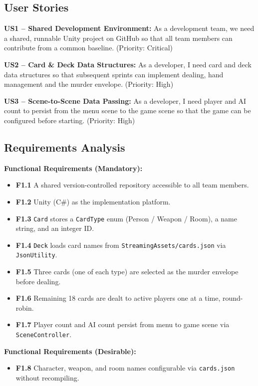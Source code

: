 \subsection*{User Stories}

\textbf{US1 -- Shared Development Environment:} As a development team, we need a shared, runnable Unity project on GitHub so that all team members can contribute from a common baseline. (Priority: Critical)

\textbf{US2 -- Card \& Deck Data Structures:} As a developer, I need card and deck data structures so that subsequent sprints can implement dealing, hand management and the murder envelope. (Priority: High)

\textbf{US3 -- Scene-to-Scene Data Passing:} As a developer, I need player and AI count to persist from the menu scene to the game scene so that the game can be configured before starting. (Priority: High)

\subsection*{Requirements Analysis}

\textbf{Functional Requirements (Mandatory):}
\begin{itemize}
    \item \textbf{F1.1} A shared version-controlled repository accessible to all team members.
    \item \textbf{F1.2} Unity (C\#) as the implementation platform.
    \item \textbf{F1.3} \texttt{Card} stores a \texttt{CardType} enum (Person / Weapon / Room), a name string, and an integer ID.
    \item \textbf{F1.4} \texttt{Deck} loads card names from \texttt{StreamingAssets/cards.json} via \texttt{JsonUtility}.
    \item \textbf{F1.5} Three cards (one of each type) are selected as the murder envelope before dealing.
    \item \textbf{F1.6} Remaining 18 cards are dealt to active players one at a time, round-robin.
    \item \textbf{F1.7} Player count and AI count persist from menu to game scene via \texttt{SceneController}.
\end{itemize}

\textbf{Functional Requirements (Desirable):}
\begin{itemize}
    \item \textbf{F1.8} Character, weapon, and room names configurable via \texttt{cards.json} without recompiling.
\end{itemize}

